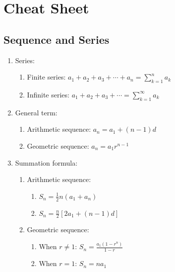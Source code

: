 \documentclass{report}
\begin{document}
\chapter{Cheat Sheet}
\begin{multicols}{2}
    \setcounter{section}{11}
    \section{Sequence and Series}

    \begin{enumerate}
        \item Series:
              \begin{enumerate}
                  \item Finite series: $a_1 + a_2 + a_3 + \cdots + a_n = \sum_{k=1}^n a_k$
                  \item Infinite series: $a_1 + a_2 + a_3 + \cdots = \sum_{k=1}^\infty a_k$
              \end{enumerate}
        \item General term:
              \begin{enumerate}
                  \item Arithmetic sequence: $a_n = a_1 + (n-1)d$
                  \item Geometric sequence: $a_n = a_1 r^{n-1}$
              \end{enumerate}
        \item Summation formula:
              \begin{enumerate}
                  \item Arithmetic sequence:
                        \begin{enumerate}
                            \item $S_n = \frac{1}{2}n(a_1 + a_n)$
                            \item $S_n = \frac{n}{2}[2a_1 + (n-1)d]$
                        \end{enumerate}
                  \item Geometric sequence:
                        \begin{enumerate}
                            \item When $r \neq 1$: $S_n = \frac{a_1(1-r^n)}{1-r}$
                            \item When $r = 1$: $S_n = na_1$
                        \end{enumerate}
              \end{enumerate}

\end{enumerate}
\end{multicols}
\end{document}
